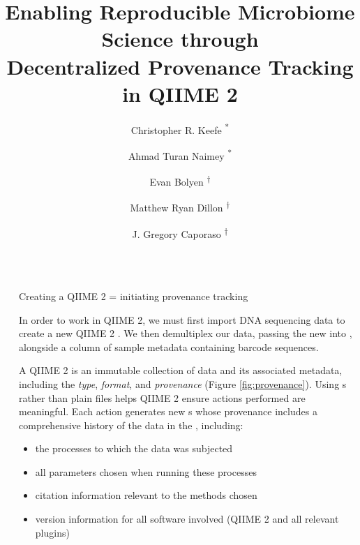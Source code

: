 \documentclass[final]{beamer}
\title{Enabling Reproducible Microbiome Science through \\ Decentralized Provenance Tracking in QIIME 2}
\author{Christopher R. Keefe \textsuperscript{*} \and Ahmad Turan Naimey \textsuperscript{*} \and Evan Bolyen \textsuperscript{†} \and Matthew Ryan Dillon \textsuperscript{†} \and J. Gregory Caporaso \textsuperscript{†} }
\institute[shortinst]{The Pathogen and Microbiome Institute at Northern Arizona University \\
{\footnotesize \textsuperscript{*} Equal Contributors \hskip .5cm \textsuperscript{†} Advisors} }
\newlength{\sepwidth}
\newlength{\colwidth}
\newcommand{\separatorcolumn}{\begin{column}{\sepwidth}\end{column}}
\begin{document}
\begin{frame}[t]
\begin{columns}[t]
\separatorcolumn

\begin{column}{\colwidth}


  \begin{block}{Creating a QIIME 2  = initiating provenance tracking}

   In order to work in QIIME 2, we must first import DNA sequencing data to create a new
   QIIME 2 . We then demultiplex our data, passing the new 
   into , alongside a column of sample metadata containing
   barcode sequences.

   \begin{tcolorbox}
   [width=\textwidth, colframe=blue]
   {A QIIME 2  is an immutable collection of data and its associated
           metadata, including the \textit{type}, \textit{format}, and \textit{provenance} (Figure \ref{fig:provenance}).
   Using s rather than plain files helps QIIME 2 ensure actions
   performed are meaningful. Each action generates new s whose
   provenance includes a comprehensive history of the data in the
   , including:}
    \begin{itemize}
      \item {the processes to which the data was subjected}
      \item {all parameters chosen when running these processes}
      \item {citation information relevant to the methods chosen}
      \item {version information for all software involved (QIIME 2 and all relevant plugins)}
    \end{itemize}
    \end{tcolorbox}
  \end{block}


\end{column}
\end{columns}
\end{frame}
\end{document}
